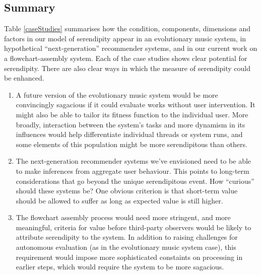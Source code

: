 \subsection{Summary}

Table \ref{caseStudies} summarises how the condition, components,
dimensions and factors in our model of serendipity appear in an
evolutionary music system, in hypothetical ``next-generation''
recommender systems, and in our current work on a flowchart-assembly
system.  Each of the case studies shows clear potential for
serendipity.  There are also clear ways in which the measure of
serendipity could be enhanced.

\begin{enumerate}
\item A future version of the evolutionary music system would be more
  convincingly sagacious if it could evaluate works without user
  intervention.  It might also be able to tailor its fitness function
  to the individual user.  More broadly, interaction between the
  system's tasks and more dynamism in its influences would help
  differentiate individual threads or system runs, and some elements
  of this population might be more serendipitous than others.

\item The next-generation recommender systems we've envisioned need to
  be able to make inferences from aggregate user behaviour.  This
  points to long-term considerations that go beyond the unique
  serendipitous event.  How ``curious'' should these systems be?  One
  obvious criterion is that short-term value should be allowed to
  suffer as long as expected value is still higher.

\item The flowchart assembly process would need more stringent, and
  more meaningful, criteria for value before third-party observers
  would be likely to attribute serendipity to the system.  In addition
  to raising challenges for autonomous evaluation (as in the
  evolutionary music system case), this requirement would impose more
  sophisticated constaints on processing in earlier steps, which would
  require the system to be more sagacious.
\end{enumerate}

